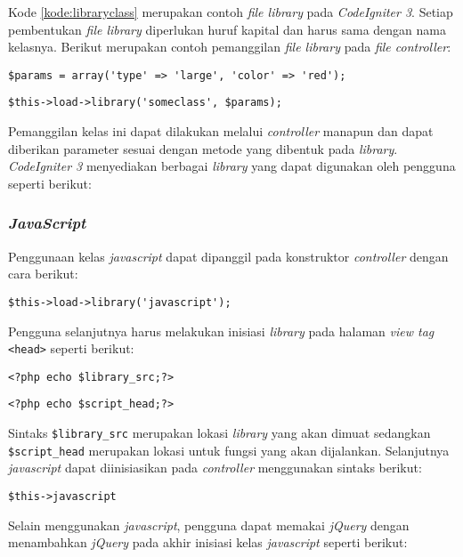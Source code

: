 Kode \ref{kode:libraryclass} merupakan contoh \textit{file library} pada \textit{CodeIgniter 3}. Setiap pembentukan \textit{file library} diperlukan huruf kapital dan harus sama dengan nama kelasnya. Berikut merupakan contoh pemanggilan \textit{file library} pada \textit{file controller}:

\begin{center}
\verb|$params = array('type' => 'large', 'color' => 'red');|

\verb|$this->load->library('someclass', $params);|
\end{center} 

Pemanggilan kelas ini dapat dilakukan melalui \textit{controller} manapun dan dapat diberikan parameter sesuai dengan metode yang dibentuk pada \textit{library}. \textit{CodeIgniter 3} menyediakan berbagai \textit{library} yang dapat digunakan oleh pengguna seperti berikut:

\subsubsection{\textit{JavaScript}}
Penggunaan kelas \textit{javascript} dapat dipanggil pada konstruktor \textit{controller} dengan cara berikut:

\begin{center}
\verb|$this->load->library('javascript');|
\end{center}

Pengguna selanjutnya harus melakukan inisiasi \textit{library} pada halaman \textit{view tag} \verb|<head>| seperti berikut:

\begin{center}
\verb|<?php echo $library_src;?>|

\verb|<?php echo $script_head;?>|
\end{center}

Sintaks \verb|$library_src| merupakan lokasi \textit{library} yang akan dimuat sedangkan \verb|$script_head| merupakan lokasi untuk fungsi yang akan dijalankan. Selanjutnya \textit{javascript} dapat diinisiasikan pada \textit{controller} menggunakan sintaks berikut:

\begin{center}
	\verb|$this->javascript|
\end{center}

Selain menggunakan \textit{javascript}, pengguna dapat memakai \textit{jQuery} dengan menambahkan \textit{jQuery} pada akhir inisiasi kelas \textit{javascript} seperti berikut:


